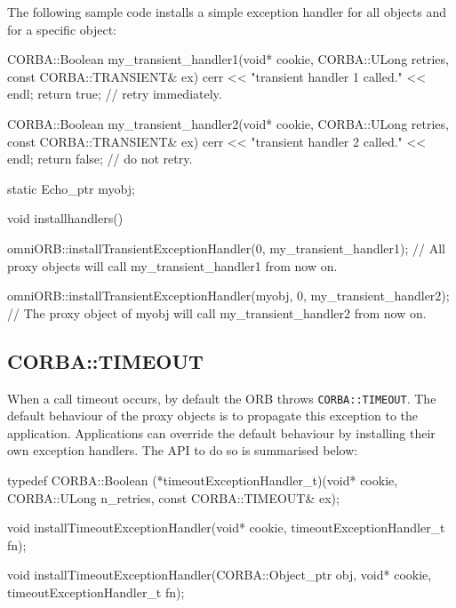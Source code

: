 \documentclass[11pt,oneside,a4paper]{book}
\newcommand{\code}[1]{\texttt{#1}}
\begin{document}
The following sample code installs a simple exception handler for all
objects and for a specific object:

\begin{cxxlisting}
CORBA::Boolean my_transient_handler1(void* cookie,
                                     CORBA::ULong retries,
                                     const CORBA::TRANSIENT& ex)
{
   cerr << "transient handler 1 called." << endl;
   return true;           // retry immediately.
}
 
CORBA::Boolean my_transient_handler2(void* cookie,
                                     CORBA::ULong retries,
                                     const CORBA::TRANSIENT& ex)
{
   cerr << "transient handler 2 called." << endl;
   return false;          // do not retry.
}


static Echo_ptr myobj;

void installhandlers()
{
   omniORB::installTransientExceptionHandler(0, my_transient_handler1);
   // All proxy objects will call my_transient_handler1 from now on.

   omniORB::installTransientExceptionHandler(myobj, 0, my_transient_handler2);
   // The proxy object of myobj will call my_transient_handler2 from now on.
}
\end{cxxlisting}


\subsection{CORBA::TIMEOUT}

When a call timeout occurs, by default the ORB throws
\code{CORBA::TIMEOUT}. The default behaviour of the proxy objects is
to propagate this exception to the application. Applications can
override the default behaviour by installing their own exception
handlers. The API to do so is summarised below:

\begin{cxxlisting}
typedef CORBA::Boolean
(*timeoutExceptionHandler_t)(void* cookie,
                             CORBA::ULong n_retries,
                             const CORBA::TIMEOUT& ex);

void
installTimeoutExceptionHandler(void* cookie,
                               timeoutExceptionHandler_t fn);

void
installTimeoutExceptionHandler(CORBA::Object_ptr obj,
                               void* cookie,
                               timeoutExceptionHandler_t fn);
\end{cxxlisting}
\end{document}
